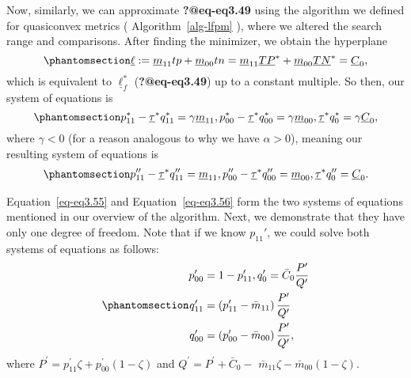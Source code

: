 \documentclass[
  letterpaper,
  numbers=noenddot,
  DIV=11]{scrreprt}
\theoremstyle{plain}
\theoremstyle{definition}
\theoremstyle{remark}
\begin{document}
Now, similarly, we can approximate \textbf{?@eq-eq3.49} using the
algorithm we defined for quasiconvex metrics
( Algorithm~\ref{alg-lfpm} ), where we altered the search range and
comparisons. After finding the minimizer, we obtain the hyperplane
\begin{equation}\phantomsection\label{eq-eq3.54}{\underline{\ell}:=\underline{m}_{11} t p+\underline{m}_{00} t n=\underline{m}_{11} \underline{TP}^{*}+\underline{m}_{00} \underline{TN}^{*} = \underline{C}_{0},}\end{equation}
which is equivalent to \(\underline{\ell}_{f}^{*}\)
(\textbf{?@eq-eq3.49}) up to a constant multiple. So then, our system of
equations is
\begin{equation}\phantomsection\label{eq-eq3.55}{p_{11}^{*}-\underline{\tau}^{*} q_{11}^{*}=\gamma \underline{m}_{11}, p_{00}^{*}-\underline{\tau}^{*} q_{00}^{*}=\gamma \underline{m}_{00}, \underline{\tau}^{*} q_{0}^{*}=\gamma \underline{C}_{0},}\end{equation}
where \(\gamma <0\) (for a reason analogous to why we have
\(\alpha >0\)), meaning our resulting system of equations is
\begin{equation}\phantomsection\label{eq-eq3.56}{\begin{aligned}
    p_{11}^{\prime \prime}-\underline{\tau}^{*} q_{11}^{\prime \prime}=\underline{m}_{11}, p_{00}^{\prime \prime}-\underline{\tau}^{*} q_{00}^{\prime \prime}=\underline{m}_{00}, \underline{\tau}^{*} q_{0}^{\prime \prime}=\underline{C}_{0}.
\end{aligned}}\end{equation}

Equation~\ref{eq-eq3.55} and Equation~\ref{eq-eq3.56} form the two
systems of equations mentioned in our overview of the algorithm. Next,
we demonstrate that they have only one degree of freedom. Note that if
we know \(p_{11}'\), we could solve both systems of equations as
follows:
\begin{equation}\phantomsection\label{eq-eq3.57}{\begin{aligned}
    p_{00}^{\prime}  &=1-p_{11}^{\prime}, q_{0}^{\prime}=\bar{C}_{0} \frac{P^{\prime}}{Q^{\prime}}\\
    q_{11}^{\prime}  &=\left(p_{11}^{\prime}-\bar{m}_{11}\right) \frac{P^{\prime}}{Q^{\prime}} \\
    q_{00}^{\prime}&=\left(p_{00}^{\prime}-\bar{m}_{00}\right) \frac{P^{\prime}}{Q^{\prime}},
\end{aligned}}\end{equation} where
\(P^{\prime}=p_{11}^{\prime} \zeta+p_{00}^{\prime}(1-\zeta)\) and
\(Q^{\prime}=P^{\prime}+\bar{C}_{0}-\)
\(\bar{m}_{11} \zeta-\bar{m}_{00}(1-\zeta).\)
\end{document}
